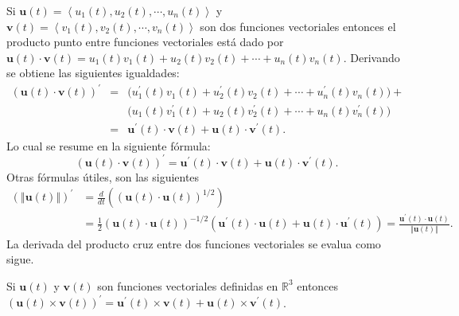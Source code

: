   Si $\mathbf{u}(t) =\left\langle u_{1}(t),u_{2}(t) ,\cdots ,u_{n}(t) \right\rangle $ y
  $\mathbf{v}(t) =\left\langle v_{1}(t) ,v_{2}\left(t\right) ,\cdots ,v_{n}(t) \right\rangle $
  son dos funciones vectoriales entonces el producto punto entre funciones vectoriales está dado por
  $\mathbf{u}(t) \cdot \mathbf{v}(t) =u_{1}\left(t\right) v_{1}(t) +u_{2}(t) v_{2}(t)+\cdots +u_{n}(t) v_{n}(t) $.
  Derivando se obtiene las siguientes igualdades:
  \begin{eqnarray*}
    \left( \mathbf{u}(t) \cdot \mathbf{v}(t) \right)^{\prime}
    &=& \big( u_{1}^{\prime }(t) v_{1}(t) +u_{2}^{\prime}(t) v_{2}(t) +\cdots +u_{n}^{\prime }(t) v_{n}(t) \big) + \\
    && \big( u_{1}(t)v_{1}^{\prime }(t) +  u_{2}(t) v_{2}^{\prime }(t) +\cdots +u_{n}(t) v_{n}^{\prime }(t)\big) \\
    &=& \mathbf{u}^{\prime }(t) \cdot \mathbf{v}(t) +\mathbf{u}(t) \cdot \mathbf{v}^{\prime }(t).
  \end{eqnarray*}
  Lo cual se resume en la siguiente fórmula:
  \begin{equation}
    \left( \mathbf{u}(t) \cdot \mathbf{v}(t) \right)^{\prime }=\mathbf{u}^{\prime }(t) \cdot \mathbf{v}\left(
    t\right) +\mathbf{u}(t) \cdot \mathbf{v}^{\prime }\left(t\right)\!.
  \end{equation}
  Otras fórmulas útiles, son las siguientes
  \begin{align*}
    (\left\Vert \mathbf{u}(t) \right\Vert)^{\prime } &= \frac{d}{dt}\left( \left( \mathbf{u}(t) \cdot \mathbf{u}(t)
    \right) ^{1/2}\right) \\
    &= \frac{1}{2}\left( \mathbf{u}(t) \cdot \mathbf{u}(t) \right) ^{-1/2}\left( \mathbf{u}^{\prime }(t) \cdot
    \mathbf{u}(t) +\mathbf{u}(t) \cdot \mathbf{u}^{\prime }(t) \right)
    = \frac{\mathbf{u}^{\prime }(t)\cdot \mathbf{u}(t) }{\left\Vert \mathbf{u}(t)\right\Vert }.
  \end{align*}
  La derivada del producto cruz entre dos funciones vectoriales se evalua como sigue.
  \begin{prop}
    Si $\mathbf{u}(t)$ y $\mathbf{v}(t)$ son funciones vectoriales definidas en $\mathbb{R}^3$ entonces
    $\left(\mathbf{u}(t)\times\mathbf{v}(t)\right)^{\prime}= \mathbf{u}^{\prime}(t)\times\mathbf{v}(t)+\mathbf{u}(t)\times \mathbf{v}^{\prime}(t)$.
  \end{prop}

